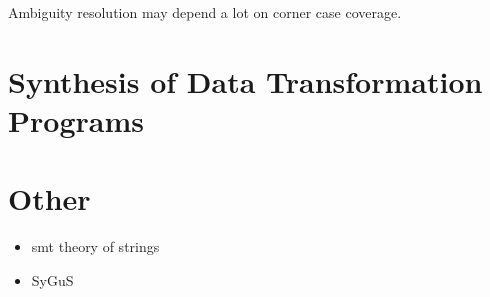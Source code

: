  Ambiguity resolution may depend a lot on corner case coverage.

\section{Synthesis of Data Transformation Programs}
\label{sec:data-trans-synth}


\section{Other}
\label{sec:other}

\begin{itemize}
\item smt theory of strings
\item SyGuS
\end{itemize}

